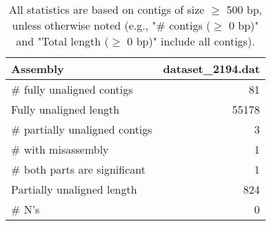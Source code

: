 \documentclass[12pt,a4paper]{article}
\begin{document}
\begin{table}[ht]
\begin{center}
\caption{All statistics are based on contigs of size $\geq$ 500 bp, unless otherwise noted (e.g., "\# contigs ($\geq$ 0 bp)" and "Total length ($\geq$ 0 bp)" include all contigs).}
\begin{tabular}{|l*{1}{|r}|}
\hline
Assembly & dataset\_2194.dat \\ \hline
\# fully unaligned contigs & 81 \\ \hline
Fully unaligned length & 55178 \\ \hline
\# partially unaligned contigs & 3 \\ \hline
\hspace{5mm}\# with misassembly & 1 \\ \hline
\hspace{5mm}\# both parts are significant & 1 \\ \hline
Partially unaligned length & 824 \\ \hline
\# N's & 0 \\ \hline
\end{tabular}
\end{center}
\end{table}
\end{document}
